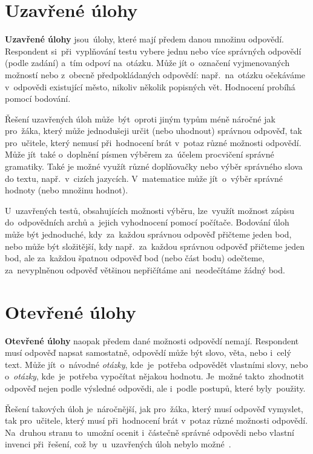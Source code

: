 \documentclass[11pt,a4paper]{report}
\begin{document}
        \section{Uzavřené úlohy}
            \textbf{Uzavřené úlohy} jsou~úlohy, které mají předem danou množinu odpovědí. Respondent si~při~vyplňování testu vybere jednu nebo více správných odpovědí (podle zadání) a~tím odpoví na~otázku. Může jít o~označení vyjmenovaných možností nebo z~obecně předpokládaných odpovědí: např.~na~otázku  očekáváme v~odpovědi existující město, nikoliv několik popisných vět. Hodnocení probíhá pomocí bodování.

            Řešení uzavřených úloh může~být~oproti jiným typům méně náročné jak pro~žáka, který může jednodušeji určit (nebo uhodnout) správnou odpověď, tak pro~učitele, který nemusí při~hodnocení brát v~potaz různé možnosti odpovědí. 
            Může jít~také o~doplnění písmen výběrem za~účelem procvičení správné gramatiky. Také je možné využít různé doplňovačky nebo výběr správného slova do textu, např.~v~cizích jazycích. V~matematice může jít~o~výběr správné hodnoty (nebo množinu hodnot). 
            
            U~uzavřených testů, obsahujících možnosti výběru, lze~využít možnost zápisu do~odpovědních archů a~jejich vyhodnocení pomocí počítače.
            Bodování úloh může být jednoduché, kdy~za~každou správnou odpověď přičteme jeden bod, nebo může být složitější, kdy např.~za~každou správnou odpověď přičteme jeden bod, ale za~každou špatnou odpověď bod (nebo část bodu) odečteme, za~nevyplněnou odpověď většinou nepřičítáme ani~neodečítáme žádný bod.

        \section{Otevřené úlohy}
            \textbf{Otevřené úlohy} naopak předem dané možnosti odpovědí nemají. Respondent musí odpověď napsat samostatně, odpovědí může být slovo, věta, nebo i~celý text. Může jít~o~návodné \emph{otázky}, kde~je~potřeba odpovědět vlastními slovy, nebo o~\emph{otázky}, kde~je~potřeba vypočítat nějakou hodnotu. Je~možné takto~zhodnotit odpověď nejen podle výsledné odpovědi, ale i~podle postupů, které byly~použity.

            Řešení takových úloh je~náročnější, jak pro~žáka, který musí odpověď vymyslet, tak pro~učitele, který musí při~hodnocení brát v~potaz různé možnosti odpovědí. Na~druhou stranu to~umožní ocenit i~částečně správné odpovědi nebo vlastní invenci při~řešení, což by~u~uzavřených úloh nebylo možné~\cite{rozhlasOUtazky}.
\end{document}
